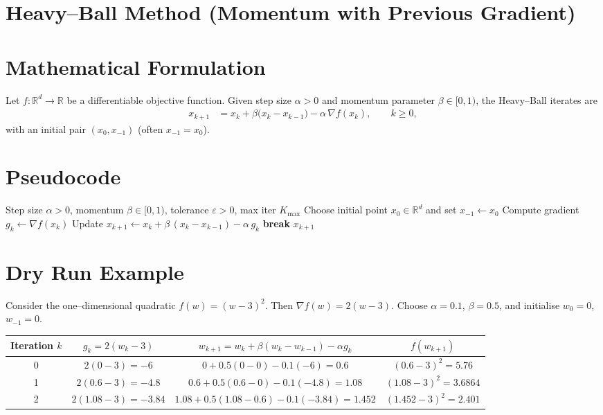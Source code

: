 \documentclass{article}
\newcommand{\norm}[1]{\left\lVert #1 \right\rVert}
\newcommand{\grad}{\nabla}
\begin{document}
\section*{Heavy–Ball Method (Momentum with Previous Gradient)}

\section*{Mathematical Formulation}
Let $f:\mathbb{R}^{d}\rightarrow\mathbb{R}$ be a differentiable objective function.  
Given step size $\alpha>0$ and momentum parameter $\beta\in[0,1)$, the Heavy–Ball iterates are
\[
\boxed{
\begin{aligned}
x_{k+1}&=x_{k}+\beta\bigl(x_{k}-x_{k-1}\bigr)-\alpha\,\grad f(x_{k}),\qquad k\ge 0,
\end{aligned}}
\]
with an initial pair $(x_{0},x_{-1})$ (often $x_{-1}=x_{0}$).

\section*{Pseudocode}
\begin{algorithm}[H]
\caption{Heavy–Ball Method}
\begin{algorithmic}[1]
\Require Step size $\alpha>0$, momentum $\beta\in[0,1)$, tolerance $\varepsilon>0$, max iter $K_{\max}$
\State Choose initial point $x_{0}\in\mathbb{R}^{d}$ and set $x_{-1}\gets x_{0}$
    \State Compute gradient $g_{k}\gets \grad f(x_{k})$
    \State Update $x_{k+1}\gets x_{k}+\beta\,(x_{k}-x_{k-1})-\alpha\,g_{k}$
    \If{$\norm{g_{k}}\le \varepsilon$}
        \State \textbf{break}
    \EndIf
\EndFor
\State \Return $x_{k+1}$
\end{algorithmic}
\end{algorithm}

\section*{Dry Run Example}
Consider the one–dimensional quadratic $f(w)=(w-3)^{2}$.  
Then $\grad f(w)=2(w-3)$.  Choose $\alpha=0.1$, $\beta=0.5$, and initialise $w_{0}=0$, $w_{-1}=0$.

\begin{tabular}{c|c|c|c}
Iteration $k$ & $g_{k}=2(w_{k}-3)$ & $w_{k+1}=w_{k}+\beta(w_{k}-w_{k-1})-\alpha g_{k}$ & $f(w_{k+1})$\\ \hline
0 & $2(0-3)=-6$ & $0+0.5(0-0)-0.1(-6)=0.6$ & $(0.6-3)^{2}=5.76$\\
1 & $2(0.6-3)=-4.8$ & $0.6+0.5(0.6-0)-0.1(-4.8)=1.08$ & $(1.08-3)^{2}=3.6864$\\
2 & $2(1.08-3)=-3.84$ & $1.08+0.5(1.08-0.6)-0.1(-3.84)=1.452$ & $(1.452-3)^{2}=2.401$\\
\end{tabular}
\end{document}
